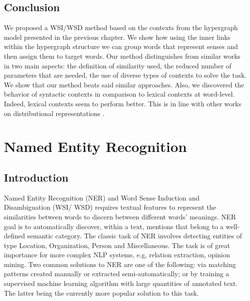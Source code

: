 \subsection{Conclusion}

We proposed a WSI/WSD method based on the contexts from the hypergraph model presented in the previous chapter. We show how using the inner links within the hypergraph structure we can group words that represent senses and then assign them to target words. Our method distinguishes from similar works in two main aspects: the definition of similarity used, the reduced number of parameters that are needed, the use of diverse types of contexts to solve the task. 	We show that our method beats said similar approaches. Also, we discovered the behavior of syntactic contexts in comparison to lexical contexts at word-level. Indeed, lexical contexts seem to perform better. This is in line with other works on distributional representations \cite{kiela2014systematic}.


\section{Named Entity Recognition}
\label{chap:fusion}


\subsection{Introduction}
Named Entity Recognition (NER) and Word Sense Induction and Disambiguation (WSI/ \allowbreak WSD) requires textual features to represent the similarities between words to discern between different words' meanings. NER goal is to automatically discover, within a text, mentions that belong to a well-defined semantic category. The classic task of NER involves detecting entities of type Location, Organization, Person and Miscellaneous. The task is of great importance for more complex NLP systems, e.g, relation extraction, opinion mining. Two common solutions to NER are one of the following: via matching patterns created manually or extracted semi-automatically; or by training a supervised machine learning algorithm with large quantities of annotated text. The latter being the currently more popular solution to this task.






